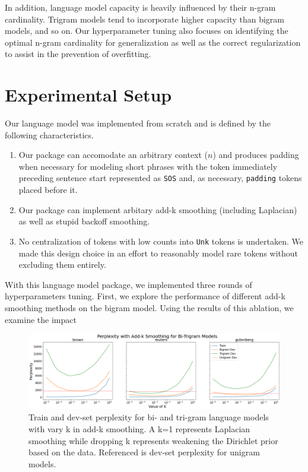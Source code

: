\documentclass[11pt,a4paper]{article}
\begin{document}
In addition, language model capacity is heavily influenced by their n-gram cardinality. Trigram models
tend to incorporate higher capacity than bigram models, and so on. Our hyperparameter tuning also focuses on 
identifying the optimal n-gram cardinality for generalization as well as the correct regularization to assist
in the prevention of overfitting.


\section{Experimental Setup}%
\label{sec:experimental_setup}

Our language model was implemented from scratch and is defined by the following 
characteristics. 
\begin{enumerate}
  \item Our package can accomodate an arbitrary context ($n$) and
    produces padding when necessary for modeling short phrases with the token 
    immediately preceding sentence start represented as \texttt{SOS} and, as necessary,
    \texttt{padding} tokens placed before it.
  \item Our package can implement arbitary add-k smoothing (including Laplacian) as well as
    stupid backoff smoothing.
  \item No centralization of tokens with low counts into \texttt{Unk} tokens is undertaken.
    We made this design choice in an effort to reasonably
    model rare tokens without excluding them entirely.
\end{enumerate}

With this language model package, we implemented three rounds of hyperparameters tuning. First,
we explore the performance of different add-k smoothing methods on the bigram model. Using the results
of this ablation, we examine the impact 
\FloatBarrier
\begin{figure}[htpb]
  \centering
  \includegraphics[width=1\linewidth]{imgs/smooth_all.png}
  \caption{Train and dev-set perplexity for bi- and tri-gram 
  language models with vary k in add-k smoothing. A k=1 represents
Laplacian smoothing while dropping k represents weakening the Dirichlet 
prior based on the data. Referenced is dev-set perplexity for unigram models.}
  \label{fig:imgs/smooth_all}
  \vspace{-15pt}
\end{figure}
\FloatBarrier
\end{document}
